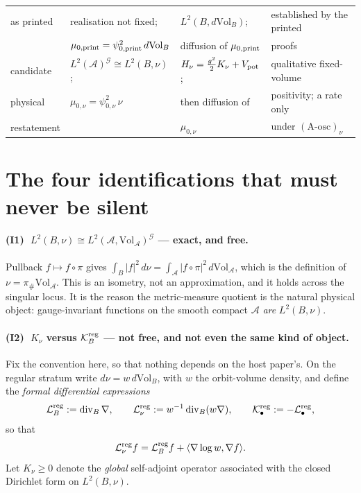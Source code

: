 \documentclass[11pt]{article}
\newcommand{\A}{\mathcal A}
\newcommand{\G}{\mathcal G}
\begin{document}
\begin{center}
\begin{tabular}{|l|l|l|l|}
as printed
 & realisation not fixed;
 & $L^2(B,d\mathrm{Vol}_B)$;
 & established by the printed\\
 & $\mu_{0,\rm print}
 =\psi_{0,\rm print}^2\,d\mathrm{Vol}_B$
 & diffusion of $\mu_{0,\rm print}$
 & proofs\\
\hline
candidate
 & $L^2(\A)^{\G}\cong L^2(B,\nu)$;
 & $H_\nu=\frac{g^2}{2}K_\nu
 +V_{\rm pot}$;
 & qualitative fixed-volume\\
physical
 & $\mu_{0,\nu}=\psi_{0,\nu}^2\,\nu$
 & then diffusion of
 & positivity; a rate only\\
restatement
 &
 & $\mu_{0,\nu}$
 & under $(\text{A-osc})_\nu$\\
\hline
\end{tabular}
\end{center}

\section*{The four identifications that must never be silent}

\paragraph{(I1) $\;L^2(B,\nu)\cong L^2(\A,\mathrm{Vol}_{\A})^{\G}$ --- exact, and free.}
Pullback $f\mapsto f\circ\pi$ gives
$\int_B|f|^2\,d\nu=\int_{\A}|f\circ\pi|^2\,d\mathrm{Vol}_{\A}$, which is the
definition of $\nu=\pi_\#\mathrm{Vol}_{\A}$. This is an isometry, not an
approximation, and it holds across the singular locus. It is the reason the
metric-measure quotient is the natural physical object: gauge-invariant functions on
the smooth compact $\A$ \emph{are} $L^2(B,\nu)$.

\paragraph{(I2) $\;K_\nu$ versus $\mathcal K_B^{\rm reg}$ --- not free, and not even
the same kind of object.}
Fix the convention here, so that nothing depends on the host paper's. On the regular
stratum write $d\nu=w\,d\mathrm{Vol}_B$, with $w$ the orbit-volume density, and define
the \emph{formal differential expressions}
\[
\mathcal L_B^{\rm reg}:=\operatorname{div}_B\nabla,
\qquad
\mathcal L_\nu^{\rm reg}:=w^{-1}\operatorname{div}_B(w\nabla),
\qquad
\mathcal K_\bullet^{\rm reg}:=-\mathcal L_\bullet^{\rm reg},
\]
so that
\[
\mathcal L_\nu^{\rm reg} f=\mathcal L_B^{\rm reg} f+\langle\nabla\log w,\nabla f\rangle .
\]
Let $K_\nu\ge0$ denote the \emph{global} self-adjoint operator associated with the
closed Dirichlet form on $L^2(B,\nu)$.
\end{document}

